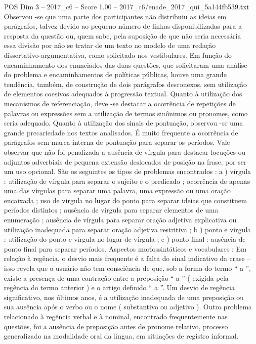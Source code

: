 \begin{textsample}{POS Dim 3 – 2017\_c6 – Score 1.00 – 2017\_c6/enade\_2017\_qui\_5a144fb539.txt}
Observou -se que uma parte dos participantes não distribuiu as ideias em parágrafos, talvez devido ao pequeno número de linhas disponibilizadas para a resposta da questão ou, quem sabe, pela suposição de que não seria necessária essa divisão por não se tratar de um texto no modelo de uma redação dissertativo-argumentativa, como solicitado nos vestibulares.
Em função do encaminhamento dos enunciados das duas questões, que solicitaram uma análise do problema e encaminhamentos de políticas públicas, houve uma grande tendência, também, de construção de dois parágrafos desconexos, sem utilização de elementos coesivos adequados à progressão textual.
Quanto à utilização dos mecanismos de referenciação, deve -se destacar a ocorrência de repetições de palavras ou expressões sem a utilização de termos sinônimos ou pronomes, como seria adequado.
Quanto à utilização dos sinais de pontuação, observou -se uma grande precariedade nos textos analisados.
É muito frequente a ocorrência de parágrafos sem marca interna de pontuação para separar os períodos.
Vale observar que não foi penalizada a ausência de vírgula para destacar locuções ou adjuntos adverbiais de pequena extensão deslocados de posição na frase, por ser um uso opcional.
São os seguintes os tipos de problemas encontrados : a ) vírgula : utilização de vírgula para separar o sujeito e o predicado ; ocorrência de apenas uma das vírgulas para separar uma palavra, uma expressão ou uma oração encaixada ; uso de vírgula no lugar do ponto para separar ideias que constituem períodos distintos ; ausência de vírgula para separar elementos de uma enumeração ; ausência de vírgula para separar oração adjetiva explicativa ou utilização inadequada para separar oração adjetiva restritiva ; b ) ponto e vírgula : utilização do ponto e vírgula no lugar de vírgula ; c ) ponto final : ausência de ponto final para separar períodos.
Aspectos morfossintáticos e vocabulares : Em relação à regência, o desvio mais frequente é a falta do sinal indicativo da crase – isso revela que o usuário não tem consciência de que, sob a forma do termo “ a ”, existe a presença de uma contração entre a preposição “ a ” ( exigida pela regência do termo anterior ) e o artigo definido “ a ”.
Um desvio de regência significativo, nos últimos anos, é a utilização inadequada de uma preposição ou sua ausência após o verbo ou o nome ( substantivo ou adjetivo ).
Outro problema relacionado à regência verbal e à nominal, encontrado frequentemente nas questões, foi a ausência de preposição antes de pronome relativo, processo generalizado na modalidade oral da língua, em situações de registro informal.

\end{textsample}
